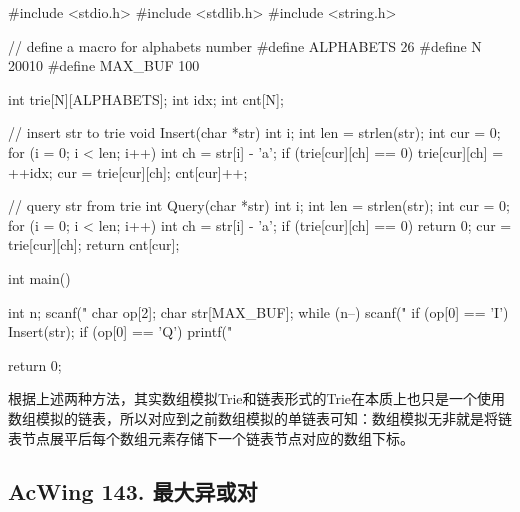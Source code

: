 \begin{mycpptwocol}[数组模拟Trie]
    #include <stdio.h>
    #include <stdlib.h>
    #include <string.h>

    // define a macro for alphabets number
    #define ALPHABETS 26
    #define N 20010
    #define MAX_BUF 100

    int trie[N][ALPHABETS];
    int idx;
    int cnt[N];

    // insert str to trie
    void Insert(char *str) {
        int i;
        int len = strlen(str);
        int cur = 0;
        for (i = 0; i < len; i++) {
            int ch = str[i] - 'a';
            if (trie[cur][ch] == 0) {
                trie[cur][ch] = ++idx;
            }
            cur = trie[cur][ch];
        }
        cnt[cur]++;
    }

    // query str from trie
    int Query(char *str) {
        int i;
        int len = strlen(str);
        int cur = 0;
        for (i = 0; i < len; i++) {
            int ch = str[i] - 'a';
            if (trie[cur][ch] == 0) {
                return 0;
            }
            cur = trie[cur][ch];
        }
        return cnt[cur];
    }

    int main() {
        int n;
        scanf("%
        char op[2];
        char str[MAX_BUF];
        while (n--) {
            scanf("%
            if (op[0] == 'I') {
                Insert(str);
            }
            if (op[0] == 'Q') {
                printf("%
            }
        }

        return 0;
    }
\end{mycpptwocol}

\begin{information}
    根据上述两种方法，其实数组模拟Trie和链表形式的Trie在本质上也只是一个使用数组模拟的链表，所以对应到之前数组模拟的单链表可知：数组模拟无非就是将链表节点展平后每个数组元素存储下一个链表节点对应的数组下标。
\end{information}

\subsection{AcWing 143. 最大异或对}

